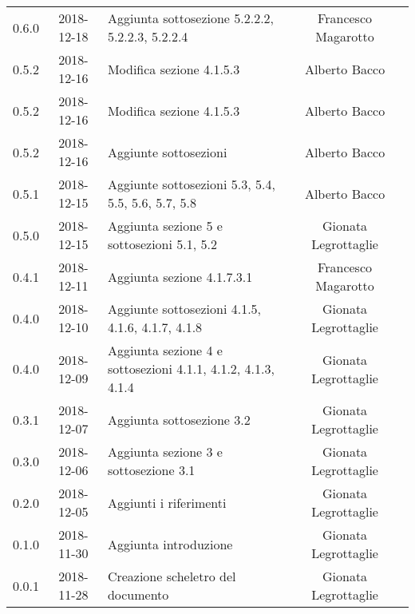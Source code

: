 {\begin{longtable}{ c c C{4cm}  c  c }
		0.6.0 & 2018-12-18 & Aggiunta sottosezione 5.2.2.2, 5.2.2.3, 5.2.2.4 & Francesco Magarotto & \reda{} \\
		
		0.5.2 & 2018-12-16 & Modifica sezione 4.1.5.3 & Alberto Bacco & \reda{} \\
		
		0.5.2 & 2018-12-16 & Modifica sezione 4.1.5.3 & Alberto Bacco & \reda{} \\
		
		0.5.2 & 2018-12-16 & Aggiunte sottosezioni  & Alberto Bacco & \reda{} \\
		
		0.5.1 & 2018-12-15 & Aggiunte sottosezioni 5.3, 5.4, 5.5, 5.6, 5.7, 5.8 & Alberto Bacco & \reda{} \\
		
		0.5.0 & 2018-12-15 & Aggiunta sezione 5 e sottosezioni 5.1, 5.2 & Gionata Legrottaglie & \reda{} \\
		
		0.4.1 & 2018-12-11 & Aggiunta sezione 4.1.7.3.1 & Francesco Magarotto & \reda{} \\ 
		
		0.4.0 & 2018-12-10 & Aggiunte sottosezioni 4.1.5, 4.1.6, 4.1.7, 4.1.8 & Gionata Legrottaglie & \reda{} \\ 
		0.4.0 & 2018-12-09 & Aggiunta sezione 4 e sottosezioni 4.1.1, 4.1.2, 4.1.3, 4.1.4 & Gionata Legrottaglie & \reda{} \\ 
		
		0.3.1 & 2018-12-07 & Aggiunta sottosezione 3.2 & Gionata Legrottaglie & \reda{} \\ 
		
		0.3.0 & 2018-12-06 & Aggiunta sezione 3 e sottosezione 3.1 & Gionata Legrottaglie & \reda{} \\ 
		
		0.2.0 & 2018-12-05 & Aggiunti i riferimenti & Gionata Legrottaglie & \reda{} \\ 
		
		0.1.0 & 2018-11-30 & Aggiunta introduzione & Gionata Legrottaglie & \reda{} \\
		
		0.0.1 & 2018-11-28 & Creazione scheletro del documento & Gionata Legrottaglie & \reda{}\\
		
	\end{longtable}

}